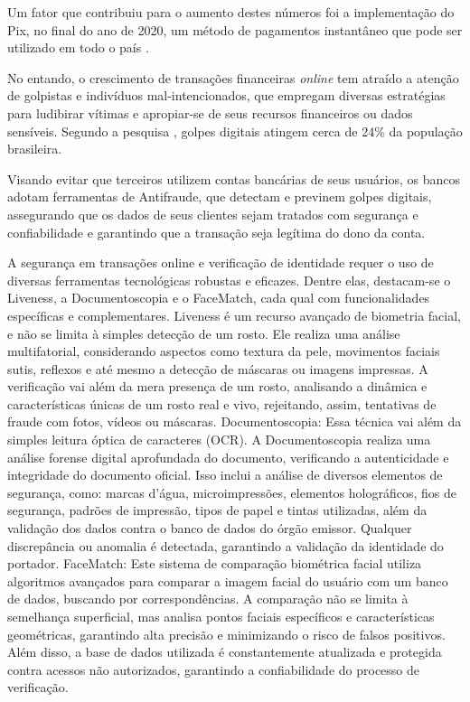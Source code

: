 Um fator que contribuiu para o aumento destes números foi a implementação do Pix, no final do ano de 2020, um método de pagamentos instantâneo que pode ser utilizado em todo o país \cite{febraban2024}.

No entando, o crescimento de transações financeiras \textit{online} tem atraído a atenção de golpistas e indivíduos mal-intencionados, que empregam diversas estratégias para ludibirar vítimas e apropiar-se de seus recursos financeiros ou dados sensíveis. Segundo a pesquisa \cite{datasenado}, golpes digitais atingem cerca de 24\% da população brasileira.

Visando evitar que terceiros utilizem contas bancárias de seus usuários, os bancos adotam ferramentas de Antifraude, que detectam e previnem golpes digitais, assegurando que os dados de seus clientes sejam tratados com segurança e confiabilidade e garantindo que a transação seja legítima do dono da conta.

A segurança em transações online e verificação de identidade requer o uso de diversas ferramentas tecnológicas robustas e eficazes. Dentre elas, destacam-se o Liveness, a Documentoscopia e o FaceMatch, cada qual com funcionalidades específicas e complementares. Liveness é um recurso avançado de biometria facial, e não se limita à simples detecção de um rosto. Ele realiza uma análise multifatorial, considerando aspectos como textura da pele, movimentos faciais sutis, reflexos e até mesmo a detecção de máscaras ou imagens impressas. A verificação vai além da mera presença de um rosto, analisando a dinâmica e características únicas de um rosto real e vivo, rejeitando, assim, tentativas de fraude com fotos, vídeos ou máscaras. Documentoscopia: Essa técnica vai além da simples leitura óptica de caracteres (OCR). A Documentoscopia realiza uma análise forense digital aprofundada do documento, verificando a autenticidade e integridade do documento oficial. Isso inclui a análise de diversos elementos de segurança, como: marcas d'água, microimpressões, elementos holográficos, fios de segurança, padrões de impressão, tipos de papel e tintas utilizadas, além da validação dos dados contra o banco de dados do órgão emissor. Qualquer discrepância ou anomalia é detectada, garantindo a validação da identidade do portador. FaceMatch: Este sistema de comparação biométrica facial utiliza algoritmos avançados para comparar a imagem facial do usuário com um banco de dados, buscando por correspondências. A comparação não se limita à semelhança superficial, mas analisa pontos faciais específicos e características geométricas, garantindo alta precisão e minimizando o risco de falsos positivos. Além disso, a base de dados utilizada é constantemente atualizada e protegida contra acessos não autorizados, garantindo a confiabilidade do processo de verificação.

